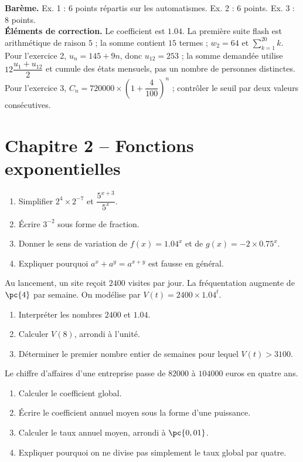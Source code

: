 \begin{solution}\textbf{Barème.} Ex. 1 : 6 points répartis sur les automatismes. Ex. 2 : 6 points. Ex. 3 : 8 points.\\
\textbf{Éléments de correction.} Le coefficient est $\num{1,04}$. La première suite flash est arithmétique de raison $5$ ; la somme contient $15$ termes ; $w_2=64$ et $\sum_{k=1}^{20}k$. Pour l'exercice 2, $u_n=145+9n$, donc $u_{12}=253$ ; la somme demandée utilise $12\dfrac{u_1+u_{12}}2$ et cumule des états mensuels, pas un nombre de personnes distinctes. Pour l'exercice 3, $C_n=\num{720000}\times\left(1+\dfrac{4}{100}\right)^n$ ; contrôler le seuil par deux valeurs consécutives.\end{solution}

\section*{Chapitre 2 -- Fonctions exponentielles}
\begin{exercise}
\begin{enumerate}
\item Simplifier $2^4\times2^{-7}$ et $\dfrac{5^{x+3}}{5^x}$.
\item Écrire $3^{-2}$ sous forme de fraction.
\item Donner le sens de variation de $f(x)=\num{1,04}^x$ et de $g(x)=-2\times\num{0,75}^x$.
\item Expliquer pourquoi $a^x+a^y=a^{x+y}$ est fausse en général.
\end{enumerate}
\end{exercise}
\begin{exercise}
Au lancement, un site reçoit $2400$ visites par jour. La fréquentation augmente de $\pc{4}$ par semaine. On modélise par $V(t)=2400\times\num{1,04}^t$.
\begin{enumerate}
\item Interpréter les nombres $2400$ et $\num{1,04}$.
\item Calculer $V(8)$, arrondi à l'unité.
\item Déterminer le premier nombre entier de semaines pour lequel $V(t)>3100$.
\end{enumerate}
\end{exercise}
\begin{exercise}
Le chiffre d'affaires d'une entreprise passe de $\num{82000}$ à $104000$ euros en quatre ans.
\begin{enumerate}
\item Calculer le coefficient global.
\item Écrire le coefficient annuel moyen sous la forme d'une puissance.
\item Calculer le taux annuel moyen, arrondi à $\pc{0,01}$.
\item Expliquer pourquoi on ne divise pas simplement le taux global par quatre.
\end{enumerate}
\end{exercise}
